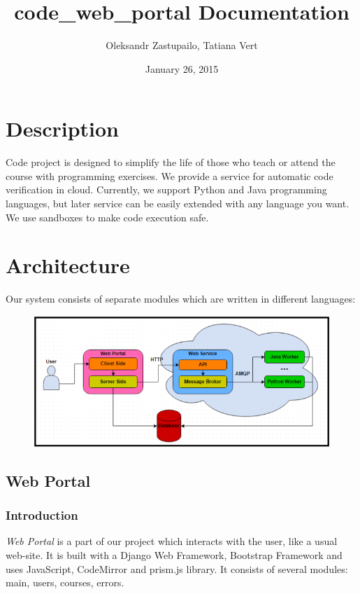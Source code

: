 \documentclass[letterpaper,10pt,english]{sphinxmanual}
\title{code\_web\_portal Documentation}
\date{January 26, 2015}
\author{Oleksandr Zastupailo, Tatiana Vert}
\begin{document}
\maketitle
\tableofcontents
{}\label{index::doc}



\chapter{Description}
\label{index:code-project-documentation}\label{index:description}\label{index:library-index}
Code project is designed to simplify the life of those who teach or attend
the course with programming exercises.
We provide a service for automatic code verification in cloud. Currently,
we support Python and Java programming languages, but later service can be
easily extended with any language you want. We use sandboxes to make code
execution safe.


\chapter{Architecture}
\label{index:architecture}
Our system consists of separate modules which are written in different
languages:
\begin{figure}[htbp]
\centering

\includegraphics{architecture.png}
\end{figure}


\section{Web Portal}
\label{web_portal:library-web-portal}\label{web_portal::doc}\label{web_portal:web-portal}

\subsection{Introduction}
\label{web_portal:introduction}
\emph{Web Portal} is a part of our project which interacts with the user, like a
usual web-site. It is built with a Django Web Framework, Bootstrap Framework
and uses JavaScript, CodeMirror and prism.js library. It consists of several
modules: main, users, courses, errors.
\end{document}

